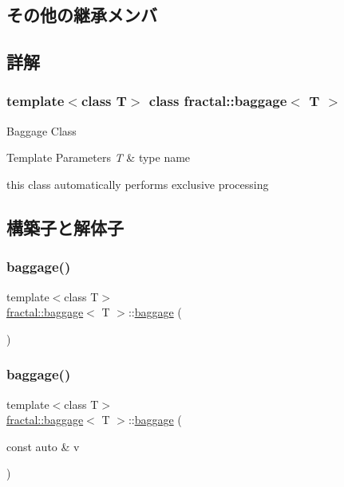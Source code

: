 \subsection*{その他の継承メンバ}


\subsection{詳解}
\subsubsection*{template$<$class T$>$\newline
class fractal\+::baggage$<$ T $>$}

Baggage Class 


\begin{DoxyTemplParams}{Template Parameters}
{\em T} & type name\\
\hline
\end{DoxyTemplParams}
this class automatically performs exclusive processing 

\subsection{構築子と解体子}
\mbox{\label{classfractal_1_1baggage_a4595c4e784aee7a446ef3e4ec4e25dbf}} 
\subsubsection{\texorpdfstring{baggage()}{baggage()}\hspace{0.1cm}{\footnotesize\ttfamily [1/3]}}
{\footnotesize\ttfamily template$<$class T$>$ \\
\hyperlink{classfractal_1_1baggage}{fractal\+::baggage}$<$ T $>$\+::\hyperlink{classfractal_1_1baggage}{baggage} (\begin{DoxyParamCaption}{ }\end{DoxyParamCaption})\hspace{0.3cm}{\ttfamily [inline]}}

\mbox{\label{classfractal_1_1baggage_a039105816c814c850137eb7ade424899}} 
\subsubsection{\texorpdfstring{baggage()}{baggage()}\hspace{0.1cm}{\footnotesize\ttfamily [2/3]}}
{\footnotesize\ttfamily template$<$class T$>$ \\
\hyperlink{classfractal_1_1baggage}{fractal\+::baggage}$<$ T $>$\+::\hyperlink{classfractal_1_1baggage}{baggage} (\begin{DoxyParamCaption}\item[{const auto \&}]{v }\end{DoxyParamCaption})\hspace{0.3cm}{\ttfamily [inline]}}

